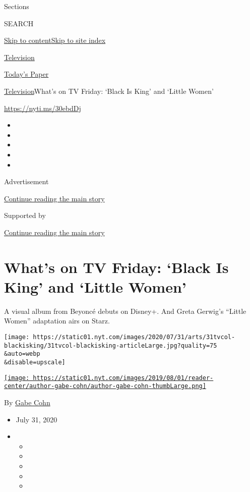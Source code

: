 Sections

SEARCH

\protect\hyperlink{site-content}{Skip to
content}\protect\hyperlink{site-index}{Skip to site index}

\href{https://www.nytimes.com/section/arts/television}{Television}

\href{https://myaccount.nytimes.com/auth/login?response_type=cookie\&client_id=vi}{}

\href{https://www.nytimes.com/section/todayspaper}{Today's Paper}

\href{/section/arts/television}{Television}\textbar{}What's on TV
Friday: `Black Is King' and `Little Women'

\url{https://nyti.ms/30ebdDj}

\begin{itemize}
\item
\item
\item
\item
\item
\end{itemize}

Advertisement

\protect\hyperlink{after-top}{Continue reading the main story}

Supported by

\protect\hyperlink{after-sponsor}{Continue reading the main story}

\hypertarget{whats-on-tv-friday-black-is-king-and-little-women}{%
\section{What's on TV Friday: `Black Is King' and `Little
Women'}\label{whats-on-tv-friday-black-is-king-and-little-women}}

A visual album from Beyoncé debuts on Disney+. And Greta Gerwig's
``Little Women'' adaptation airs on Starz.

\texttt{[image: https://static01.nyt.com/images/2020/07/31/arts/31tvcol-blackisking/31tvcol-blackisking-articleLarge.jpg?quality=75\\\&auto=webp\\\&disable=upscale]}

\href{https://www.nytimes.com/by/gabe-cohn}{\texttt{[image: https://static01.nyt.com/images/2019/08/01/reader-center/author-gabe-cohn/author-gabe-cohn-thumbLarge.png]}}

By \href{https://www.nytimes.com/by/gabe-cohn}{Gabe Cohn}

\begin{itemize}
\item
  July 31, 2020
\item
  \begin{itemize}
  \item
  \item
  \item
  \item
  \item
  \end{itemize}
\end{itemize}

